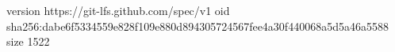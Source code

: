 version https://git-lfs.github.com/spec/v1
oid sha256:dabe6f5334559e828f109e880d894305724567fee4a30f440068a5d5a46a5588
size 1522
